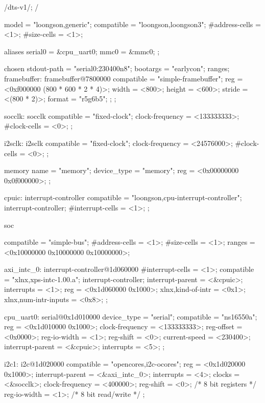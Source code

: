 \begin{CodeBlock}[language=BookDTS]
/dts-v1/;
/{
    model = "loongson,generic";
    compatible = "loongson,loongson3";
    #address-cells = <1>;
    #size-cells = <1>;

    aliases {
        serial0 = &cpu_uart0;
        mmc0 = &mmc0;
    };

    chosen {
        stdout-path = "serial0:230400n8";
        bootargs = "earlycon";
        ranges;
        framebuffer: framebuffer@7800000 {
            compatible = "simple-framebuffer";
            reg = <0xf000000 (800 * 600 * 2 * 4)>;
            width = <800>;
            height = <600>;
            stride = <(800 * 2)>;
            format = "r5g6b5";
        }; 
    };

	socclk: socclk {
		compatible = "fixed-clock";
		clock-frequency = <133333333>;
		#clock-cells = <0>;
	};

	i2sclk: i2sclk {
		compatible = "fixed-clock";
		clock-frequency = <24576000>;
		#clock-cells = <0>;
	};

    memory {
        name = "memory";
        device_type = "memory";
        reg =  <0x00000000  0x0f000000>;
    };

	cpuic: interrupt-controller {
	    compatible = "loongson,cpu-interrupt-controller";
        interrupt-controller;
		#interrupt-cells = <1>;
	};

	soc {
		compatible = "simple-bus";
		#address-cells = <1>;
		#size-cells = <1>;
		ranges = <0x10000000 0x10000000 0x10000000>;

        axi_intc_0: interrupt-controller@1d060000 {
                #interrupt-cells = <1>;
                compatible = "xlnx,xps-intc-1.00.a";
                interrupt-controller;
                interrupt-parent = <&cpuic>;
                interrupts = <1>;
                reg = <0x1d060000 0x1000>;
                xlnx,kind-of-intr = <0x1>;
                xlnx,num-intr-inputs = <0x8>;
        };

        cpu_uart0: serial@0x1d010000 {
		    device_type = "serial";
		    compatible = "ns16550a";
		    reg = <0x1d010000 0x1000>;
            clock-frequency = <133333333>;
		    reg-offset = <0x0000>;
		    reg-io-width = <1>;
		    reg-shift = <0>;
		    current-speed = <230400>;
            interrupt-parent = <&cpuic>;
		    interrupts = <5>;
        };

        i2c1: i2c@1d020000 {
            compatible = "opencores,i2c-ocores";
            reg = <0x1d020000 0x1000>;
            interrupt-parent = <&axi_intc_0>;
            interrupts = <4>;
            clocks = <&socclk>;
            clock-frequency = <400000>;
            reg-shift = <0>;	/* 8 bit registers */
            reg-io-width = <1>;	/* 8 bit read/write */
        };

}}
\end{CodeBlock}
